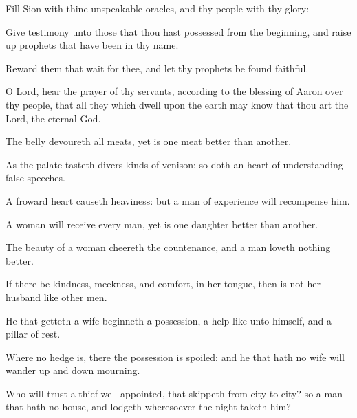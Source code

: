 {\par }{\PP {}Fill Sion with thine unspeakable oracles, and thy people with thy glory:
\par }{\PP {}Give testimony unto those that thou hast possessed from the beginning, and raise up prophets that have been in thy name.
\par }{\PP {}Reward them that wait for thee, and let thy prophets be found faithful.
\par }{\PP {}O Lord, hear the prayer of thy servants, according to the blessing of Aaron over thy people, that all they which dwell upon the earth may know that thou art the Lord, the eternal God.
\par }{\PP {}The belly devoureth all meats, yet is one meat better than another.
\par }{\PP {}As the palate tasteth divers kinds of venison: so doth an heart of understanding false speeches.
\par }{\PP {}A froward heart causeth heaviness: but a man of experience will recompense him.
\par }{\PP {}A woman will receive every man, yet is one daughter better than another.
\par }{\PP {}The beauty of a woman cheereth the countenance, and a man loveth nothing better.
\par }{\PP {}If there be kindness, meekness, and comfort, in her tongue, then is not her husband like other men.
\par }{\PP {}He that getteth a wife beginneth a possession, a help like unto himself, and a pillar of rest.
\par }{\PP {}Where no hedge is, there the possession is spoiled: and he that hath no wife will wander up and down mourning.
\par }{\PP {}Who will trust a thief well appointed, that skippeth from city to city? so
{} a man that hath no house, and lodgeth wheresoever the night taketh him?

}
